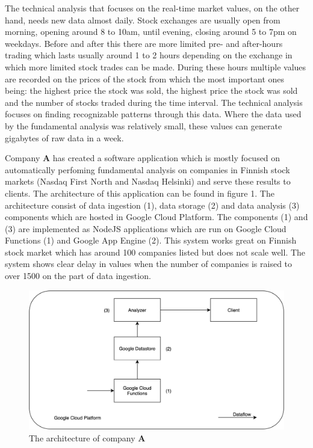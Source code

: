 \documentclass[article,11pt]{article}
\begin{document}
The technical analysis that focuses on the real-time market values, on the other hand, needs new data almost daily. Stock exchanges are usually open from morning, opening around 8 to 10am, until evening, closing around 5 to 7pm on weekdays. Before and after this there are more limited pre- and after-hours trading which lasts usually around 1 to 2 hours depending on the exchange in which more limited stock trades can be made. During these hours multiple values are recorded on the prices of the stock from which the most important ones being: the highest price the stock was sold, the highest price the stock was sold and the number of stocks traded during the time interval. The technical analysis focuses on finding recognizable patterns through this data. \cite{murphy} Where the data used by the fundamental analysis was relatively small, these values can generate gigabytes of raw data in a week.

Company \textbf{A} has created a software application which is mostly focused on automatically perfoming fundamental analysis on companies in Finnish stock markets (Nasdaq First North and Nasdaq Helsinki) and serve these results to clients. The architecture of this application can be found in figure 1. The architecture consist of data ingestion (1), data storage (2) and data analysis (3) components which are hosted in Google Cloud Platform. The components (1) and (3) are implemented as NodeJS applications which are run on Google Cloud Functions (1) and Google App Engine (2). This system works great on Finnish stock market which has around 100 companies listed but does not scale well. The system shows clear delay in values when the number of companies is raised to over 1500 on the part of data ingestion. 

\begin{figure}[h]
    \includegraphics[scale=0.3]{system} 
    \centering
    \caption{The architecture of company \textbf{A}}
\end{figure}
\end{document}
